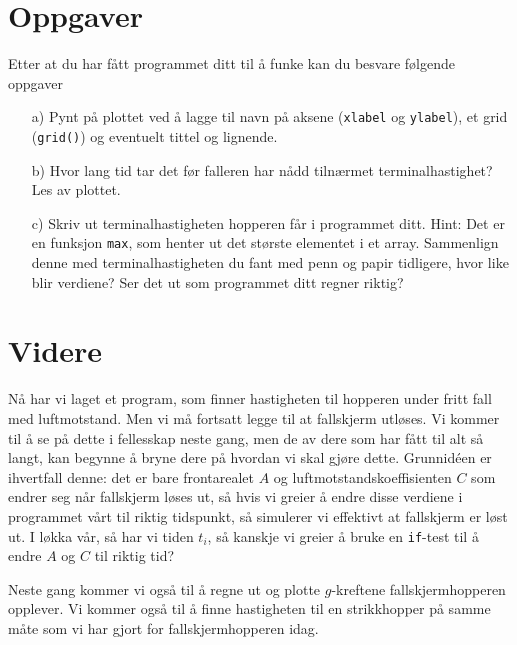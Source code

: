 \documentclass[a4paper, 11pt, notitlepage, english]{article}
\begin{document}
\section*{Oppgaver}
Etter at du har fått programmet ditt til å funke kan du besvare følgende oppgaver
\begin{itemize}
    \item[a)] Pynt på plottet ved å lagge til navn på aksene (\verb+xlabel+ og \verb+ylabel+), et grid (\verb+grid()+) og eventuelt tittel og lignende.
    \item[b)] Hvor lang tid tar det før falleren har nådd tilnærmet terminalhastighet? Les av plottet.
    \item[c)] Skriv ut terminalhastigheten hopperen får i programmet ditt. Hint: Det er en funksjon \verb+max+, som henter ut det største elementet i et array. Sammenlign denne med terminalhastigheten du fant med penn og papir tidligere, hvor like blir verdiene? Ser det ut som programmet ditt regner riktig?
\end{itemize}

\clearpage

\section*{Videre}
Nå har vi laget et program, som finner hastigheten til hopperen under fritt fall med luftmotstand. Men vi må fortsatt legge til at fallskjerm utløses. Vi kommer til å se på dette i fellesskap neste gang, men de av dere som har fått til alt så langt, kan begynne å bryne dere på hvordan vi skal gjøre dette. Grunnidéen er ihvertfall denne: det er bare frontarealet $A$ og luftmotstandskoeffisienten $C$ som endrer seg når fallskjerm løses ut, så hvis vi greier å endre disse verdiene i programmet vårt til riktig tidspunkt, så simulerer vi effektivt at fallskjerm er løst ut. I løkka vår, så har vi tiden $t_i$, så kanskje vi greier å bruke en \verb+if+-test til å endre $A$ og $C$ til riktig tid?

Neste gang kommer vi også til å regne ut og plotte $g$-kreftene fallskjermhopperen opplever. Vi kommer også til å finne hastigheten til en strikkhopper på samme måte som vi har gjort for fallskjermhopperen idag.
\end{document}
